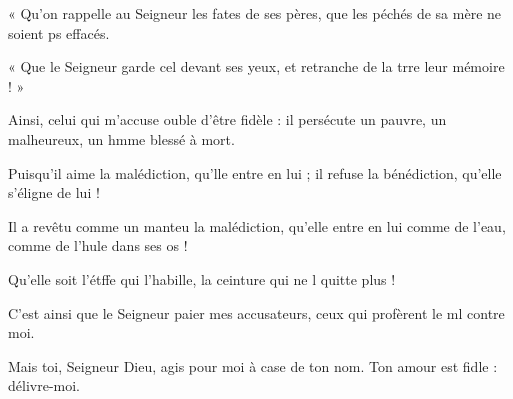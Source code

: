 \item « Qu'on rappelle au Seigneur les fates de ses pères,\psstar{} que les péchés de sa mère ne soient ps effacés.
\item « Que le Seigneur garde cel devant ses yeux,\psstar{} et retranche de la trre leur mémoire ! »
\item Ainsi, celui qui m'accuse ouble d'être fidèle :\psstar{} il persécute un pauvre, un malheureux, un hmme blessé à mort.
\item Puisqu'il aime la malédiction, qu'lle entre en lui ;\psstar{} il refuse la bénédiction, qu'elle s'éligne de lui !
\item Il a revêtu comme un manteu la malédiction,\psstar{} qu'elle entre en lui comme de l'eau, comme de l'hule dans ses os !
\item Qu'elle soit l'étffe qui l'habille,\psstar{} la ceinture qui ne l quitte plus !
\item C'est ainsi que le Seigneur paier mes accusateurs,\psstar{} ceux qui profèrent le ml contre moi.
\item Mais toi, Seigneur Dieu, agis pour moi à case de ton nom.\psstar{} Ton amour est fidle : délivre-moi.